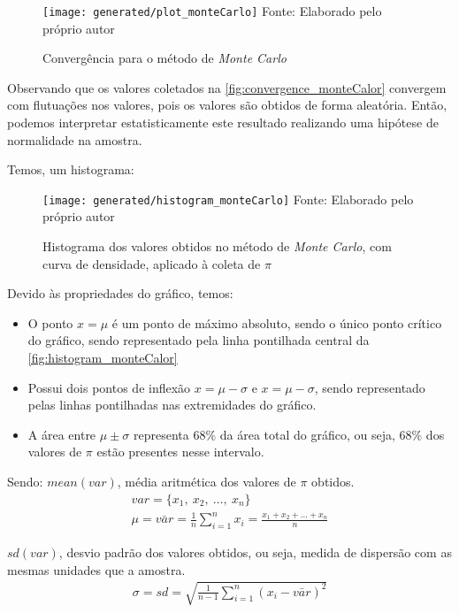 \begin{figure}[H]
   \centering
   \caption{Convergência para o método de \textit{Monte Carlo}}
   \texttt{[image: generated/plot\_monteCarlo]}
   Fonte: Elaborado pelo próprio autor
   \label{fig:convergence_monteCalor}
\end{figure}%

Observando que os valores coletados na \autoref{fig:convergence_monteCalor} convergem com flutuações nos valores, pois os valores são obtidos de forma aleatória. Então, podemos interpretar estatisticamente este resultado realizando uma hipótese de normalidade na amostra.
 
Temos, um histograma:

\begin{figure}[H]
   \centering
   \caption{Histograma dos valores obtidos no método de \textit{Monte Carlo}, com curva de densidade, aplicado à coleta de $\pi$}
   \texttt{[image: generated/histogram\_monteCarlo]}
   Fonte: Elaborado pelo próprio autor
   \label{fig:histogram_monteCalor}
\end{figure}%

Devido às propriedades do gráfico, temos:
\begin{itemize}
   \item O ponto $x = \mu$ é um ponto de máximo absoluto, sendo o único ponto crítico do gráfico, sendo representado pela linha pontilhada central da \autoref{fig:histogram_monteCalor}
   \item Possui dois pontos de inflexão $x = \mu - \sigma$ e $x = \mu - \sigma$, sendo representado pelas linhas pontilhadas nas extremidades do gráfico.
   \item A área entre $\mu \pm \sigma$ representa $68\%$ da área total do gráfico, ou seja, $68\%$ dos valores de $\pi$ estão presentes nesse intervalo.
\end{itemize}
Sendo:
$mean(var)$, média aritmética dos valores de $\pi$ obtidos.
\begin{gather*}
   var = \{x_{1},\ x_{2},\ \dots,\ x_{n}\} \\
   \mu = \bar{var} = \frac{1}{n} \sum_{i=1}^{n} x_{i} = \frac{x_{1} + x_{2} + \dots + x_{n}}{n}
\end{gather*}

$sd(var)$, desvio padrão dos valores obtidos, ou seja, medida de dispersão com as mesmas unidades que a amostra.
\begin{gather*}
   \sigma = sd = \sqrt{\frac{1}{n-1}\sum_{i=1}^{n}\left(x_{i}-\bar{var}\right)^{2}}
\end{gather*}

